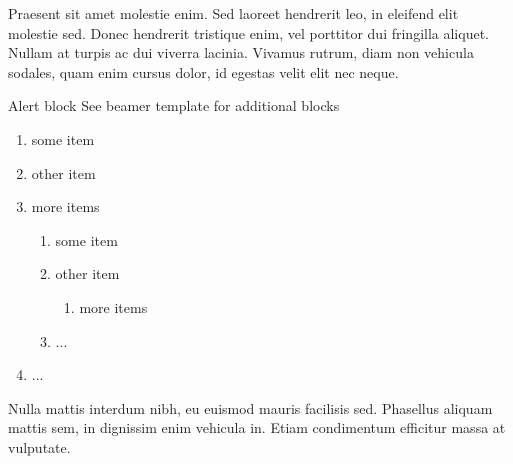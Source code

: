 \documentclass{beamer}
\begin{document}
\begin{frame}[t]
\begin{columns}[t]
\begin{column}{.49\textwidth}
		Praesent sit amet molestie enim. Sed laoreet hendrerit leo, in eleifend elit molestie sed. Donec hendrerit tristique enim, vel porttitor dui fringilla aliquet. Nullam at turpis ac dui viverra lacinia. Vivamus rutrum, diam non vehicula sodales, quam enim cursus dolor, id egestas velit elit nec neque. 
		
		\begin{alertblock}{Alert block}
		See beamer template for additional blocks
		\end{alertblock}
		
		\begin{enumerate}
		\item some item
		\item other item
		\item more items 
			\begin{enumerate}
			\item some item
			\item other item
				\begin{enumerate}
				\item more items 
				\end{enumerate}
			\item ...
			\end{enumerate}
		\item ...
		\end{enumerate}
	
		 Nulla mattis interdum nibh, eu euismod mauris facilisis sed. Phasellus aliquam mattis sem, in dignissim enim vehicula in. Etiam condimentum efficitur massa at vulputate.
	\end{column}
\end{columns}

\end{frame}
\end{document}
